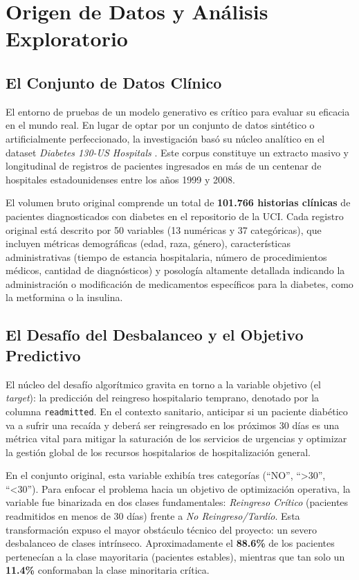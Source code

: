 \section{Origen de Datos y Análisis Exploratorio}

\subsection{El Conjunto de Datos Clínico}

El entorno de pruebas de un modelo generativo es crítico para evaluar su eficacia en el mundo real. En lugar de optar por un conjunto de datos sintético o artificialmente perfeccionado, la investigación basó su núcleo analítico en el dataset \textit{Diabetes 130-US Hospitals} \parencite{strack2014diabetes}. Este corpus constituye un extracto masivo y longitudinal de registros de pacientes ingresados en más de un centenar de hospitales estadounidenses entre los años 1999 y 2008.

El volumen bruto original comprende un total de \textbf{101.766 historias clínicas} de pacientes diagnosticados con diabetes en el repositorio de la UCI. Cada registro original está descrito por 50 variables (13 numéricas y 37 categóricas), que incluyen métricas demográficas (edad, raza, género), características administrativas (tiempo de estancia hospitalaria, número de procedimientos médicos, cantidad de diagnósticos) y posología altamente detallada indicando la administración o modificación de medicamentos específicos para la diabetes, como la metformina o la insulina.

\subsection{El Desafío del Desbalanceo y el Objetivo Predictivo}

El núcleo del desafío algorítmico gravita en torno a la variable objetivo (el \textit{target}): la predicción del reingreso hospitalario temprano, denotado por la columna \texttt{readmitted}. En el contexto sanitario, anticipar si un paciente diabético va a sufrir una recaída y deberá ser reingresado en los próximos 30 días es una métrica vital para mitigar la saturación de los servicios de urgencias y optimizar la gestión global de los recursos hospitalarios de hospitalización general.

En el conjunto original, esta variable exhibía tres categorías (``NO'', ``>30'', ``<30''). Para enfocar el problema hacia un objetivo de optimización operativa, la variable fue binarizada en dos clases fundamentales: \textit{Reingreso Crítico} (pacientes readmitidos en menos de 30 días) frente a \textit{No Reingreso/Tardío}. Esta transformación expuso el mayor obstáculo técnico del proyecto: un severo desbalanceo de clases intrínseco. Aproximadamente el \textbf{88.6\%} de los pacientes pertenecían a la clase mayoritaria (pacientes estables), mientras que tan solo un \textbf{11.4\%} conformaban la clase minoritaria crítica.

